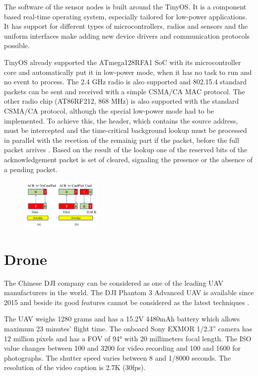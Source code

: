 \documentclass[conference]{IEEEtran}
\begin{document}
The software of the sensor nodes is built around the TinyOS. It is a component
based real-time operating system, especially tailored for low-power
applications. It has support for different types of microcontrollers, radios
and sensors and the uniform interfaces make adding new device drivers and
communication protocols possible.

TinyOS already supported the ATmega128RFA1 SoC with its microcontroller core
and automatically put it in low-power mode, when it has no task to run and no
event to process. The 2.4 GHz radio is also supported and 802.15.4 standard
packets can be sent and received with a simple CSMA/CA MAC protocol. The other
radio chip (AT86RF212, 868 MHz) is also supported with the standard CSMA/CA
protocol, although the special low-power mode had to be implemented. To achieve this,
the header, which contains the source address, must be intercepted and the
time-critical background lookup must be processed in parallel with the recetion
of the remainig part if the packet, before the full packet arrives \cite{vakulya2013}.
Based on
the result of the lookup one of the reserved bits of the acknowledgement packet
is set of cleared, signaling the presence or the absence of a pending packet.

\begin{figure}[htbp]
	\centering
	\includegraphics[width=0.35\textwidth]{fig/protocol.png}
  \caption{}
	\label{fig-piggyback}
\end{figure}

\section{Drone}

The Chinese DJI company can be considered as one of the leading UAV
manufacturers in the world. The DJI Phantom 3 Advanced UAV is available since
2015 and beside its good features cannot be considered as the latest techniques
\cite{udvardy2019}.

The UAV weighs 1280 grams and has a 15.2V 4480mAh battery which allows maximum
23 minutes’ flight time. The onboard Sony EXMOR 1/2.3” camera has 12 million
pixels and has a FOV of 94° with 20 millimeters focal length. The ISO value
changes between 100 and 3200 for video recording and 100 and 1600 for
photographs. The shutter speed varies between 8 and 1/8000 seconds. The
resolution of the video caption is 2.7K (30fps).
\end{document}
